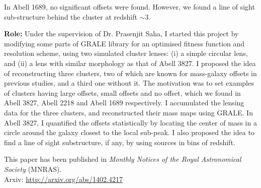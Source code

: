 In Abell 1689, no significant offsets were found. However,  
we found a line of sight sub-structure behind the cluster at
redshift $\sim 3$. 

{\bf Role:} Under the supervision of Dr. Prasenjit Saha,
I started this project by modifying some parts of 
GRALE library for an optimised fitness function and resolution scheme,
using two simulated cluster lenses: (i) a simple circular lens, and 
(ii) a lens with similar morphology as that of Abell 3827. I proposed the
idea of reconstructing three clusters, two of which are known for
mass-galaxy offsets in previous studies, 
and a third one without it. The motivation was to set examples 
of clusters having large offsets, small offsets and no offset, which we
found in Abell 3827, Abell 2218 and Abell 1689 respectively. I accumulated
the lensing data for the three clusters, and reconstructed their mass 
maps using GRALE. In Abell 3827, I quantified the offsets statistically
by locating the center of mass in a circle around the galaxy closest to 
the local sub-peak. I also proposed the idea to find a line of sight
substructure, if any, by using sources in bins of redshift.


This paper has been published in {\it Monthly Notices of the Royal Astronomical
Society} (MNRAS). 
\\
Arxiv: \url{http://arxiv.org/abs/1402.4217}


\clearpage
